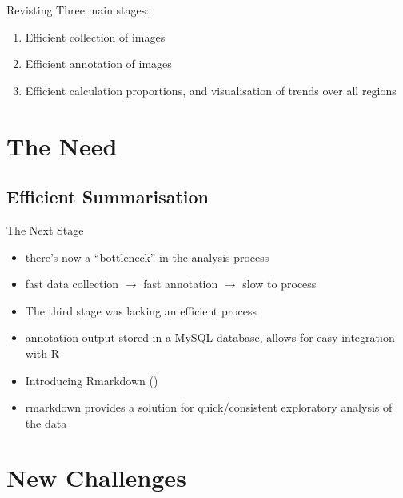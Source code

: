 \documentclass{beamer}
\newcommand{\cmark}{\ding{51}}
\newcommand{\xmark}{\ding{55}}
\begin{document}
              \begin{frame}{Revisting}
                  Three main stages:
                    \begin{enumerate}
                      \item <1->{
                      Efficient collection of images \uncover<2->{ \cmark}
                      }
                      \item <3-> {
                      Efficient annotation of images  { \cmark}
                      }
                      \item <5-> {
                      Efficient calculation proportions, and visualisation of trends over all regions  { \xmark}
                      }
                    \end{enumerate}
              \end{frame}

    \section{The Need}
        \subsection{Efficient Summarisation}
            \begin{frame}{The Next Stage}
                \begin{itemize}
                  \item there's now a ``bottleneck'' in the analysis process
                  \item fast data collection $\rightarrow$ fast annotation $\rightarrow$ slow to process
                  \item The third stage was lacking an efficient process
                  \item annotation output stored in a MySQL database, allows for easy integration with R
                  \item Introducing Rmarkdown (\cite{rmarkdown})
                  \item rmarkdown provides a solution for quick/consistent exploratory analysis of the data
                \end{itemize}
            \end{frame}


      \section{New Challenges}
\end{document}
